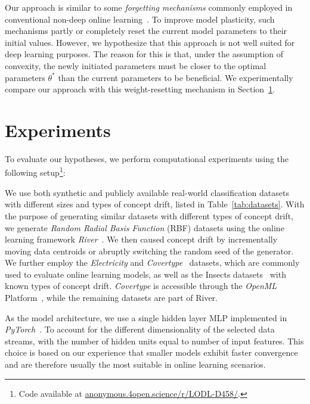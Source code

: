 \documentclass[runningheads]{llncs}
\begin{document}
Our approach is similar to some \textit{forgetting mechanisms} commonly employed in conventional non-deep online learning~\cite{gamaSurveyConceptDrift2014}.
To improve model plasticity, such mechanisms partly or completely reset the current model parameters to their initial values.
However, we hypothesize that this approach is not well suited for deep learning purposes.
The reason for this is that, under the assumption of convexity, the newly initiated parameters must be closer to the optimal parameters $\theta^*$ than the current parameters to be beneficial.
We experimentally compare our approach with this weight-resetting mechanism in Section~\ref{sec:experiments}.

\section{Experiments}\label{sec:experiments}

To evaluate our hypotheses, we perform computational experiments using the following setup\footnote[2]{Code available at \url{anonymous.4open.science/r/LODL-D458/}.}:

We use both synthetic and publicly available real-world classification datasets with different sizes and types of concept drift, listed in Table~\ref{tab:datasets}.
With the purpose of generating similar datasets with different types of concept drift, we generate \textit{Random Radial Basis Function} (RBF) datasets using the online learning framework \textit{River}~\cite{montiel2021river}.
We then caused concept drift by incrementally moving data centroids or abruptly switching the random seed of the generator.
We further employ the \textit{Electricity} and \textit{Covertype}~\cite{misc_covertype_31} datasets, which are commonly used to evaluate online learning models, as well as the Insects datasets~\cite{souzaChallengesBenchmarkingStream2020} with known types of concept drift.
\textit{Covertype} is accessible through the \textit{OpenML} Platform~\cite{vanschorenOpenMLNetworkedScience2014}, while the remaining datasets are part of River.

As the model architecture, we use a single hidden layer MLP implemented in \textit{PyTorch}~\cite{paszkePyTorchImperativeStyle2019}.
To account for the different dimensionality of the selected data streams, with the number of hidden units equal to number of input features.
This choice is based on our experience that smaller models exhibit faster convergence and are therefore usually the most suitable in online learning scenarios.
\end{document}
